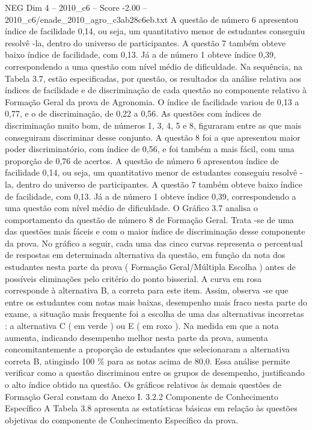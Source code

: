 \begin{textsample}{NEG Dim 4 – 2010\_c6 – Score -2.00 – 2010\_c6/enade\_2010\_agro\_c3ab28c6eb.txt}
A questão de número 6 apresentou índice de facilidade 0,14, ou seja, um quantitativo menor de estudantes conseguiu resolvê -la, dentro do universo de participantes.
A questão 7 também obteve baixo índice de facilidade, com 0,13.
Já a de número 1 obteve índice 0,39, correspondendo a uma questão com nível médio de dificuldade.
Na sequência, na Tabela 3.7, estão especificadas, por questão, os resultados da análise relativa aos índices de facilidade e de discriminação de cada questão no componente relativo à Formação Geral da prova de Agronomia.
O índice de facilidade variou de 0,13 a 0,77, e o de discriminação, de 0,22 a 0,56.
As questões com índices de discriminação muito bom, de números 1, 3, 4, 5 e 8, figuraram entre as que mais conseguiram discriminar desse conjunto.
A questão 8 foi a que apresentou maior poder discriminatório, com índice de 0,56, e foi também a mais fácil, com uma proporção de 0,76 de acertos.
A questão de número 6 apresentou índice de facilidade 0,14, ou seja, um quantitativo menor de estudantes conseguiu resolvê -la, dentro do universo de participantes.
A questão 7 também obteve baixo índice de facilidade, com 0,13.
Já a de número 1 obteve índice 0,39, correspondendo a uma questão com nível médio de dificuldade.
O Gráfico 3.7 analisa o comportamento da questão de número 8 de Formação Geral.
Trata -se de uma das questões mais fáceis e com o maior índice de discriminação desse componente da prova.
No gráfico a seguir, cada uma das cinco curvas representa o percentual de respostas em determinada alternativa da questão, em função da nota dos estudantes nesta parte da prova ( Formação Geral/Múltipla Escolha ) antes de possíveis eliminações pelo critério do ponto bisserial.
A curva em rosa corresponde à alternativa B, a correta para este item.
Assim, observa -se que entre os estudantes com notas mais baixas, desempenho mais fraco nesta parte do exame, a situação mais frequente foi a escolha de uma das alternativas incorretas : a alternativa C ( em verde ) ou E ( em roxo ).
Na medida em que a nota aumenta, indicando desempenho melhor nesta parte da prova, aumenta concomitantemente a proporção de estudantes que selecionaram a alternativa correta B, atingindo 100 \% para as notas acima de 80,0.
Essa análise permite verificar como a questão discriminou entre os grupos de desempenho, justificando o alto índice obtido na questão.
Os gráficos relativos às demais questões de Formação Geral constam do Anexo I. 3.2.2 Componente de Conhecimento Específico A Tabela 3.8 apresenta as estatísticas básicas em relação às questões objetivas do componente de Conhecimento Específico da prova.

\end{textsample}
